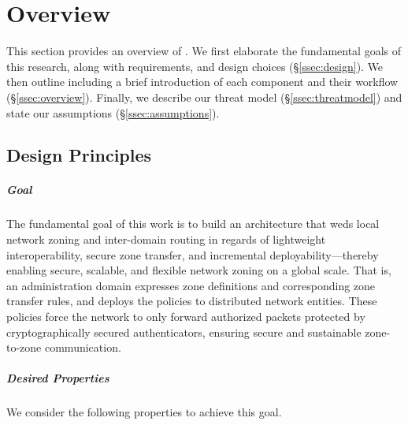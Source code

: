 \chapter{Overview}
\label{overview}

This section provides an overview of \name. We first elaborate the fundamental goals 
of this research, along with requirements, and design choices (\S\ref{ssec:design}). 
We then outline \name including a brief introduction of each component and their
workflow (\S\ref{ssec:overview}). Finally, we describe our threat model 
(\S\ref{ssec:threatmodel}) and state our assumptions (\S\ref{ssec:assumptions}).

\section{Design Principles}
\label{sec:design}

\paragraph{Goal}
The fundamental goal of this work is to build an architecture that weds local 
network zoning and inter-domain routing in regards of lightweight interoperability,
secure zone transfer, and incremental deployability---thereby enabling secure, 
scalable, and flexible network zoning on a global scale. That is, an administration 
domain expresses zone definitions and corresponding zone transfer rules, and 
deploys the policies to distributed network entities. These policies force the 
network to only forward authorized packets protected by cryptographically 
secured authenticators, ensuring secure and sustainable zone-to-zone communication.

\paragraph{Desired Properties}
We consider the following properties to achieve this goal.

